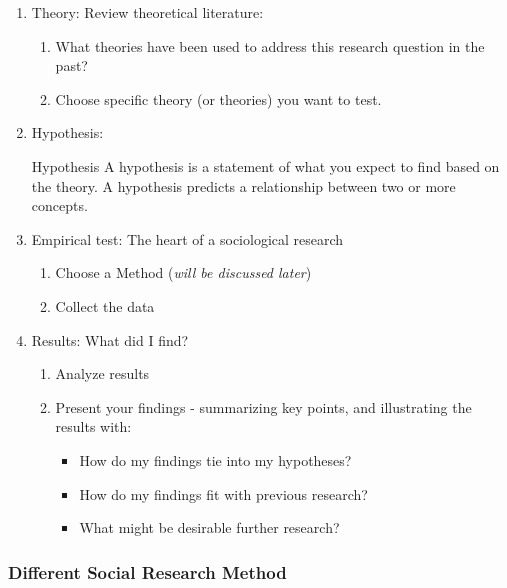 \documentclass[12pt,a4paper]{article}
\begin{document}
\begin{enumerate}
\begin{enumerate}
\begin{df}{Research Question (RQ)}
			The relationship between two or more concepts or variables. \\
			(How does A affect B? )
		\end{df}
		\item Theory: Review theoretical literature: 
		\begin{enumerate}
			\item What theories have been used to address this research question in the past?
			\item Choose specific theory (or theories) you want to test.
		\end{enumerate}
		\item Hypothesis: 
		\begin{df}{Hypothesis}
			A hypothesis is a statement of what you expect to find based on the theory. A hypothesis predicts a relationship between two or more concepts. 
		\end{df}
		\item Empirical test: The heart of a sociological research
		\begin{enumerate}
			\item Choose a Method (\textit{will be discussed later})
			\item Collect the data		
		\end{enumerate}
		\item Results: What did I find? 
		\begin{enumerate}
			\item Analyze results
			\item Present your findings - summarizing key points, and illustrating the results with:
			\begin{itemize}
				\item How do my findings tie into my hypotheses?
				\item How do my findings fit with previous research?
				\item What might be desirable further research?
			\end{itemize}
		\end{enumerate}
	\end{enumerate}
\end{enumerate}

\subsubsection{Different Social Research Method}
\end{document}
